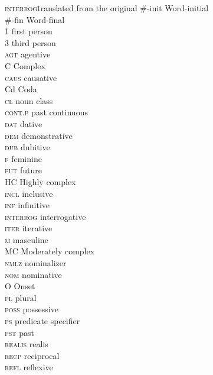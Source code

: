 \addchap{\lsAbbreviationsTitle} 
\begin{multicols}{2}
\begin{tabbing}
\textsc{interrog}\hspace{1em}\= translated from the original\kill
\#-init            \> Word-initial\\
\#-fin             \> Word-final\\
1                 \> first person\\
3                 \> third person\\
\textsc{agt}      \> agentive\\
C                 \> Complex\\
\textsc{caus}     \> causative\\
Cd                \> Coda\\
\textsc{cl}       \> noun class\\
\textsc{cont.p}   \> past continuous\\
\textsc{dat}      \> dative\\
\textsc{dem}      \> demonstrative\\
\textsc{dub}      \> dubitive\\
\textsc{f}        \> feminine\\
\textsc{fut}      \> future\\
HC                \> Highly complex\\
\textsc{incl}     \> inclusive\\
\textsc{inf}      \> infinitive\\
\textsc{interrog} \> interrogative\\
\textsc{iter}     \> iterative\\
\textsc{m}        \> masculine\\
MC                \> Moderately complex\\
\textsc{nmlz}     \> nominalizer\\
\textsc{nom}      \> nominative\\
O                 \> Onset\\
\textsc{pl}       \> plural\\
\textsc{poss}     \> possessive\\
\textsc{ps}       \> predicate specifier\\
\textsc{pst}      \> past\\
\textsc{realis}   \> realis\\
\textsc{recp}     \> reciprocal\\
\textsc{refl}     \> reflexive\\

\end{tabbing}
\end{multicols}
